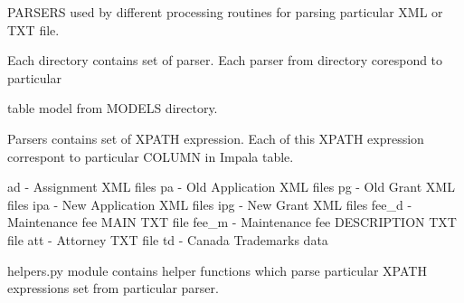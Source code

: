 P\+A\+R\+S\+E\+RS used by different processing routines for parsing particular X\+ML or T\+XT file. \begin{DoxyVerb}Each directory contains set of parser. Each parser from directory corespond to particular
\end{DoxyVerb}
 table model from M\+O\+D\+E\+LS directory.

Parsers contains set of X\+P\+A\+TH expression. Each of this X\+P\+A\+TH expression correspont to particular C\+O\+L\+U\+MN in Impala table.

ad -\/ Assignment X\+ML files pa -\/ Old Application X\+ML files pg -\/ Old Grant X\+ML files ipa -\/ New Application X\+ML files ipg -\/ New Grant X\+ML files fee\+\_\+d -\/ Maintenance fee M\+A\+IN T\+XT file fee\+\_\+m -\/ Maintenance fee D\+E\+S\+C\+R\+I\+P\+T\+I\+ON T\+XT file att -\/ Attorney T\+XT file td -\/ Canada Trademarks data

helpers.\+py module contains helper functions which parse particular X\+P\+A\+TH expressions set from particular parser. 